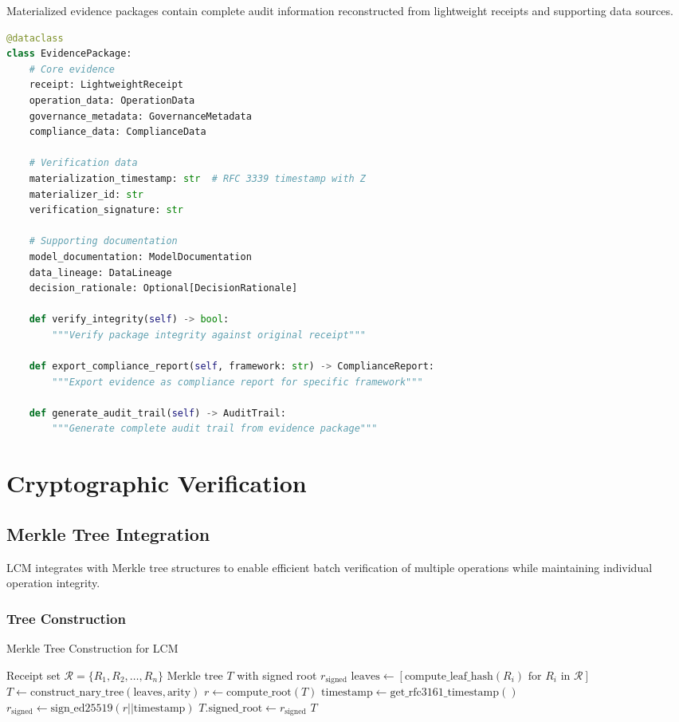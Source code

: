 \documentclass[12pt,a4paper]{article}
\begin{document}
Materialized evidence packages contain complete audit information reconstructed from lightweight receipts and supporting data sources.

\begin{lstlisting}[language=Python, caption=Evidence Package Structure]
@dataclass
class EvidencePackage:
    # Core evidence
    receipt: LightweightReceipt
    operation_data: OperationData
    governance_metadata: GovernanceMetadata
    compliance_data: ComplianceData
    
    # Verification data
    materialization_timestamp: str  # RFC 3339 timestamp with Z
    materializer_id: str
    verification_signature: str
    
    # Supporting documentation
    model_documentation: ModelDocumentation
    data_lineage: DataLineage
    decision_rationale: Optional[DecisionRationale]
    
    def verify_integrity(self) -> bool:
        """Verify package integrity against original receipt"""
        
    def export_compliance_report(self, framework: str) -> ComplianceReport:
        """Export evidence as compliance report for specific framework"""
        
    def generate_audit_trail(self) -> AuditTrail:
        """Generate complete audit trail from evidence package"""
\end{lstlisting}

\section{Cryptographic Verification}

\subsection{Merkle Tree Integration}

LCM integrates with Merkle tree structures to enable efficient batch verification of multiple operations while maintaining individual operation integrity.

\subsubsection{Tree Construction}

\begin{algorithm}[H]
\caption{Merkle Tree Construction for LCM}
\begin{algorithmic}[1]
\REQUIRE Receipt set $\mathcal{R} = \{R_1, R_2, \ldots, R_n\}$
\ENSURE Merkle tree $T$ with signed root $r_{\text{signed}}$
\STATE $\text{leaves} \leftarrow [\text{compute\_leaf\_hash}(R_i) \text{ for } R_i \text{ in } \mathcal{R}]$
\STATE $T \leftarrow \text{construct\_nary\_tree}(\text{leaves}, \text{arity})$ 
\STATE $r \leftarrow \text{compute\_root}(T)$
\STATE $\text{timestamp} \leftarrow \text{get\_rfc3161\_timestamp}()$
\STATE $r_{\text{signed}} \leftarrow \text{sign\_ed25519}(r || \text{timestamp})$
\STATE $T.\text{signed\_root} \leftarrow r_{\text{signed}}$
\RETURN $T$
\end{algorithmic}
\end{algorithm}
\end{document}
